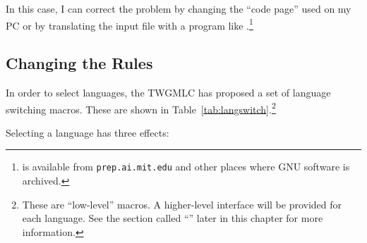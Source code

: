 In this case, I can correct the problem by changing the ``code page'' used
on my PC or by translating the input file with a program like 
.\footnote{ is available from
\texttt{prep.ai.mit.edu} and other places where GNU software is archived.}

\subsection{Changing the Rules}

In order to select languages, the TWGMLC has proposed a set of
language switching macros.  These are shown in
Table~\ref{tab:langswitch}.\footnote{These are ``low-level'' macros.
A higher-level interface will be provided for each language.  See the
section called ``'' later in this chapter for more
information.}

%

Selecting a language has three effects:

